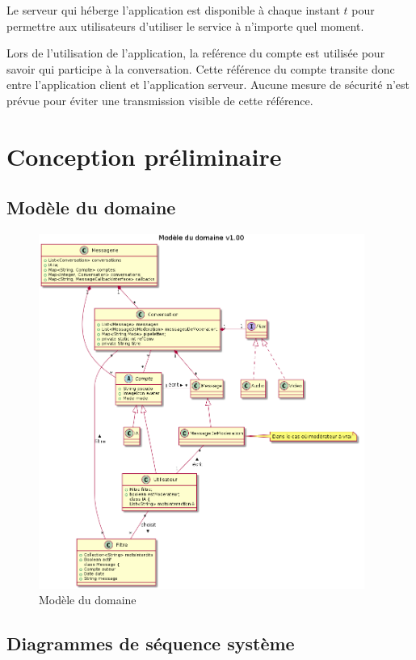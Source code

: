 \documentclass[11pt,dvipsnames,svgnames]{report}
\begin{document}
Le serveur qui héberge l'application est disponible à chaque instant $t$ pour permettre aux utilisateurs d'utiliser le service à n'importe quel moment.

Lors de l'utilisation de l'application, la reférence du compte est utilisée pour savoir qui participe à la conversation. Cette référence du compte transite donc entre l'application client et l'application serveur. Aucune mesure de sécurité n'est prévue pour éviter une transmission visible de cette référence.

\chapter{Conception préliminaire}

\section{Modèle du domaine}

\begin{figure}[H]
\centerline{\includegraphics[width=0.95\textwidth]{diagrammes/class-diag.png}}
\caption{Modèle du domaine}
\end{figure}

\section{Diagrammes de séquence système}
\end{document}
